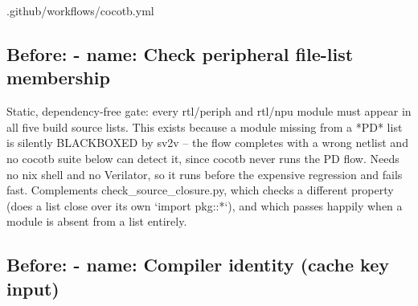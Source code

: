 \begin{relocated}{.github/workflows/cocotb.yml}
\subsection*{Before: - name: Check peripheral file-list membership}

\begin{textblock}
Static, dependency-free gate: every rtl/periph and rtl/npu module must
appear in all five build source lists. This exists because a module
missing from a *PD* list is silently BLACKBOXED by sv2v -- the flow
completes with a wrong netlist and no cocotb suite below can detect it,
since cocotb never runs the PD flow. Needs no nix shell and no Verilator,
so it runs before the expensive regression and fails fast.
Complements check_source_closure.py, which checks a different property
(does a list close over its own `import pkg::*`), and which passes
happily when a module is absent from a list entirely.
\end{textblock}

\subsection*{Before: - name: Compiler identity (cache key input)}

\end{relocated}
